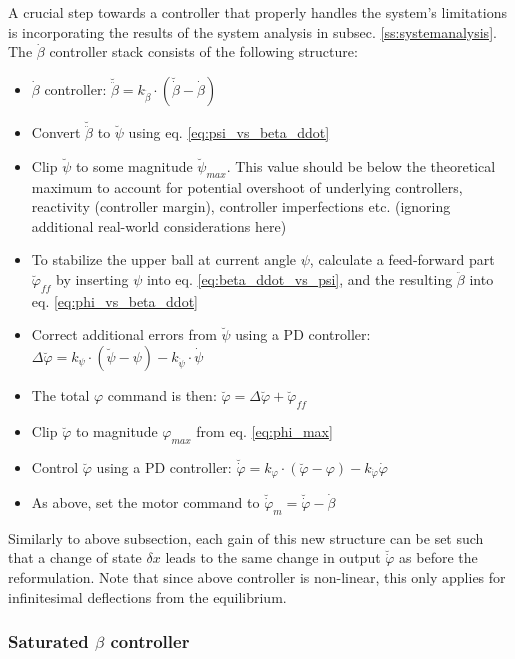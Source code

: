 \documentclass{article}
\begin{document}
A crucial step towards a controller that properly handles the system's limitations is incorporating the results of the system analysis in subsec. \ref{ss:systemanalysis}.
The $\dot{\beta}$ controller stack consists of the following structure:
\begin{itemize}
	\item{$\dot{\beta}$ controller: $\breve{\ddot{\beta}} = k_{\dot{\beta}} \cdot \left( \breve{\dot{\beta}} - \dot{\beta} \right)$}
	\item{Convert $\breve{\ddot{\beta}}$ to $\breve{\psi}$ using eq. \ref{eq:psi_vs_beta_ddot}}
	\item{Clip $\breve{\psi}$ to some magnitude $\breve{\psi}_{max}$. This value should be below the theoretical maximum to account for potential overshoot of underlying controllers, reactivity (controller margin), controller imperfections etc. (ignoring additional real-world considerations here)}
  \item{To stabilize the upper ball at current angle $\psi$, calculate a feed-forward part $\breve{\varphi}_{ff}$ by inserting $\psi$ into eq. \ref{eq:beta_ddot_vs_psi}, and the resulting $\ddot{\beta}$ into eq. \ref{eq:phi_vs_beta_ddot}}
  \item{Correct additional errors from $\breve{\psi}$ using a PD controller: $\Delta \breve{\varphi} =  k_{\psi} \cdot \left( \breve{\psi} - \psi \right) - k_{\dot{\psi}} \cdot \dot{\psi} $}
	\item{The total $\varphi$ command is then: $\breve{\varphi} = \Delta \breve{\varphi} + \breve{\varphi}_{ff} $}
  \item{Clip $\breve{\varphi}$ to magnitude $\varphi_{max}$ from eq. \ref{eq:phi_max}}
	\item{Control $\breve{\varphi}$ using a PD controller: $\breve{\dot{\varphi}} = k_{\varphi} \cdot \left( \breve{\varphi} - \varphi \right) - k_{\dot{\varphi}} \dot{\varphi}$}
	\item{As above, set the motor command to $\breve{\dot{\varphi}}_m = \breve{\dot{\varphi}} - \dot{\beta}$}
\end{itemize}
Similarly to above subsection, each gain of this new structure can be set such that a change of state $\delta x$ leads to the same change in output $\breve{\dot{\varphi}}$ as before the reformulation.
Note that since above controller is non-linear, this only applies for infinitesimal deflections from the equilibrium.

\subsubsection{Saturated $\beta$ controller}
\end{document}
